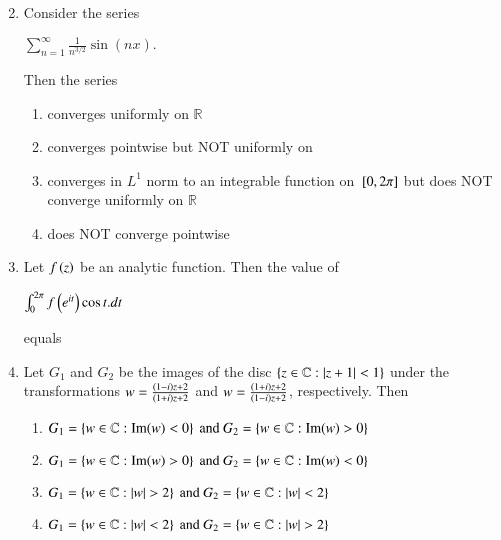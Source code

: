 \documentclass[journal]{IEEEtran}
\begin{document}
\begin{enumerate}
\begin{enumerate}
\begin{multicols}{2}
\end{multicols}
\end{enumerate}
\item  Consider the series \begin{center} $\sum_{n=1}^{\infty} \frac{1}{n^{3/2}} \sin(nx).$ \end{center}  Then the series 
\begin{enumerate}
\item converges uniformly on  $\mathbb{R} $
\item converges pointwise but NOT uniformly on %
\item converges in  $L^1$ norm to an integrable function on  ${}\left[0,2\pi\right]$ but does NOT converge uniformly on  $\mathbb{R}$ 
\item does NOT converge pointwise
\end{enumerate}
\item Let  $f\left(z\right)$ be an analytic function. Then the value of \begin{center} $\int_0^{2\pi} f\left(e^{it}\right) \cos t .dt $ \end{center} equals
\begin{enumerate}
\end{enumerate}
\newpage
\item Let $G_1$ and $G_2$ be the images of the disc  $\left\{z \in \mathbb{C} : \left\vert z+1\right\vert < 1\right\}$ under the transformations $w = \frac{\left(1-i\right)z+2}{\left(1+i\right)z+2}$  and $ w = \frac{\left(1+i\right)z+2}{\left(1-i\right)z+2}$, respectively. Then \\
\begin{enumerate}
\item $ G_1 = \left\{w \in \mathbb{C}: \text{Im}(w) < 0\right\} \text{ and } G_2 = \left\{w \in \mathbb{C}: \text{Im}(w) > 0\right\} $
\item $ G_1 = \left\{w \in \mathbb{C}: \text{Im}(w) > 0\right\} \text{ and } G_2 = \left\{w \in \mathbb{C}: \text{Im}(w) < 0\right\} $
\item $ G_1 = \left\{w \in \mathbb{C}: |w| > 2\right\} \text{ and } G_2 = \left\{w \in \mathbb{C}: |w| < 2\right\}  $
\item $ G_1 = \left\{w \in \mathbb{C}: |w| < 2\right\} \text{ and } G_2 = \left\{w \in \mathbb{C}: |w| > 2\right\} $
\end{enumerate}
\end{enumerate}
\end{document}
